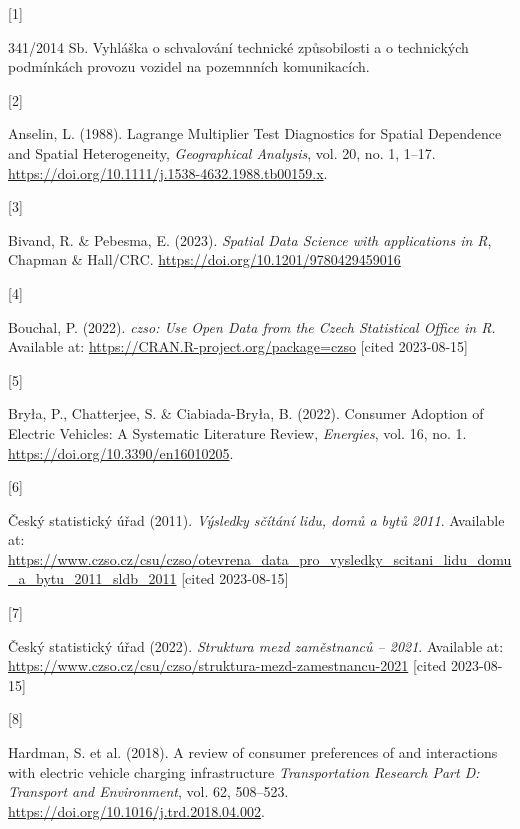 \documentclass{mmeproc}
\newlength{\cslhangindent}
\newlength{\csllabelwidth}
\newenvironment{CSLReferences}[2] %
 {%
  \setlength{\parindent}{0pt}
  \ifodd #1
  \fi
  \setlength{\parskip}{-2pt}
 }%
 {}
\newcommand{\CSLLeftMargin}[1]{\parbox[t]{\csllabelwidth}{#1}}
\newcommand{\CSLRightInline}[1]{\parbox[t]{\linewidth - \csllabelwidth}{#1}\break}
\begin{document}
\hfill

\hypertarget{refs}{}
\begin{CSLReferences}{0}{0}

\leavevmode{}%
\CSLLeftMargin{{[}1{]} }%
\CSLRightInline{{341/2014 {Sb}. {Vyhláška} o schvalování technické
způsobilosti a o technických podmínkách provozu vozidel na pozemnních
komunikacích.} }

\leavevmode{}%
\CSLLeftMargin{{[}2{]} }%
\CSLRightInline{Anselin, L. (1988). {Lagrange {Multiplier} {Test}
{Diagnostics} for {Spatial} {Dependence} and {Spatial}
{Heterogeneity},} \emph{Geographical Analysis}, vol. 20, no. 1,
1--17. \url{https://doi.org/10.1111/j.1538-4632.1988.tb00159.x}.}

\leavevmode{}%
\CSLLeftMargin{{[}3{]} }%
\CSLRightInline{Bivand, R. \& Pebesma, E. (2023). \emph{Spatial {Data} {Science}
with applications in {R}}, Chapman \& Hall/CRC. \url{https://doi.org/10.1201/9780429459016}}

\leavevmode{}%
\CSLLeftMargin{{[}4{]} }%
\CSLRightInline{Bouchal, P. (2022). \emph{{czso}: {Use} {Open} {Data} from the
{Czech} {Statistical} {Office} in {R}.} Available at:
\url{https://CRAN.R-project.org/package=czso} {{[}cited 2023-08-15{]}}}

\leavevmode{}%
\CSLLeftMargin{{[}5{]} }%
\CSLRightInline{Bryła, P., Chatterjee, S. \& Ciabiada-Bryła, B. (2022).
{Consumer {Adoption} of {Electric} {Vehicles}: {A} {Systematic}
{Literature} {Review},} \emph{Energies}, vol. 16, no. 1.
\url{https://doi.org/10.3390/en16010205}.}

\leavevmode{}%
\CSLLeftMargin{{[}6{]} }%
\CSLRightInline{Český statistický úřad (2011).  \emph{Výsledky sčítání lidu, domů a bytů 2011}. Available at:
\url{https://www.czso.cz/csu/czso/otevrena_data_pro_vysledky_scitani_lidu_domu_a_bytu_2011_sldb_2011} {{[}cited 2023-08-15{]}}}

\leavevmode{}%
\CSLLeftMargin{{[}7{]} }%
\CSLRightInline{{Český statistický úřad} (2022). \emph{Struktura mezd zaměstnanců -- 2021}. Available at:
\url{https://www.czso.cz/csu/czso/struktura-mezd-zamestnancu-2021} {{[}cited 2023-08-15{]}}}

\leavevmode{}%
\CSLLeftMargin{{[}8{]} }%
\CSLRightInline{Hardman, S. et al. (2018). {A review of consumer
preferences of and interactions with electric vehicle charging
infrastructure} \emph{Transportation Research Part D: Transport and
Environment}, vol. 62, 508--523. \url{https://doi.org/10.1016/j.trd.2018.04.002}.}


\end{CSLReferences}
\end{document}

